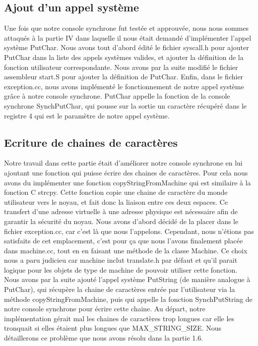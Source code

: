 \documentclass[12pt]{article}
\begin{document}
\bigbreak
\subsection{Ajout d'un appel système}
Une fois que notre console synchrone fut testée et approuvée, nous nous sommes attaqués à la partie IV dans laquelle il nous était demandé d'implémenter l'appel système \textcolor{blue2}{PutChar}.
\newline
Nous avons tout d'abord édité le fichier \textcolor{vert2}{syscall.h} pour ajouter \textcolor{blue2}{PutChar} dans la liste des appels systèmes valides, et ajouter la définition de la fonction utilisateur correspondante.
Nous avons par la suite modifié le fichier assembleur \textcolor{vert2}{start.S} pour ajouter la définition de \textcolor{blue2}{PutChar}.
Enfin, dans le fichier \textcolor{vert2}{exception.cc}, nous avons implémenté le fonctionnement de notre appel système grâce à notre console synchrone. \textcolor{blue2}{PutChar} appelle la fonction de la console synchrone \textcolor{red2}{SynchPutChar}, qui pousse sur la sortie un caractère récupéré dans le registre 4 qui est le paramètre de notre appel système.

\bigbreak
\subsection{Ecriture de chaines de caractères}
Notre travail dans cette partie était d'améliorer notre console synchrone en lui ajoutant une fonction qui puisse écrire des chaines de caractères. Pour cela nous avons du implémenter une fonction \textcolor{red2}{copyStringFromMachine} qui est similaire à la fonction C \textcolor{red2}{strcpy}. Cette fonction copie une chaine de caractère du monde utilisateur vers le noyau, et fait donc la liaison entre ces deux espaces.
Ce transfert d'une adresse virtuelle à une adresse physique est nécessaire afin de garantir la sécurité du noyau.
\newline \newline
Nous avons d'abord décidé de la placer dans le fichier \textcolor{vert2}{exception.cc}, car c'est là que nous l'appelons. Cependant, nous n'étions pas satisfaits de cet emplacement, c'est pour ça que nous l'avons finalement placée dans \textcolor{vert2}{machine.cc}, tout en en faisant une méthode de la classe Machine.
Ce choix nous a paru judicieu car machine inclut translate.h par défaut et qu'il parait logique pour les objets de type de machine de pouvoir utiliser cette fonction.
\newline \newline
Nous avons par la suite ajouté l'appel système \textcolor{blue2}{PutString} (de manière analogue à \textcolor{blue2}{PutChar}), qui récupère la chaine de caractères entrée par l'utilisateur via la méthode \textcolor{red2}{copyStringFromMachine}, puis qui appelle la fonction \textcolor{red2}{SynchPutString} de notre console synchrone pour écrire cette chaine.
Au départ, notre implémentation gérait mal les chaines de caractères trop longues car elle les tronquait si elles étaient plus longues que MAX\_STRING\_SIZE. Nous détaillerons ce problème que nous avons résolu dans la partie 1.6.
\end{document}
